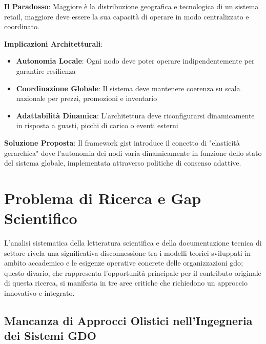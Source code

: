 \begin{tcolorbox}[
    colback=blue!5!white,
    colframe=blue!75!black,
    title={\textbf{Innovation Box 1.1:} Il Paradosso della Complessità Sistemica nella \gls{gdo}},
    fonttitle=\bfseries,
    boxrule=1.5pt,
    arc=2mm,
    breakable
]
\textbf{Il Paradosso}: Maggiore è la distribuzione geografica e tecnologica di un sistema retail, maggiore deve essere la sua capacità di operare in modo centralizzato e coordinato.

\vspace{0.3cm}
\textbf{Implicazioni Architetturali}:
\begin{itemize}
    \item \textbf{Autonomia Locale}: Ogni nodo deve poter operare indipendentemente per garantire resilienza
    \item \textbf{Coordinazione Globale}: Il sistema deve mantenere coerenza su scala nazionale per prezzi, promozioni e inventario
    \item \textbf{Adattabilità Dinamica}: L'architettura deve riconfigurarsi dinamicamente in risposta a guasti, picchi di carico o eventi esterni
\end{itemize}

\vspace{0.3cm}
\textbf{Soluzione Proposta}: Il framework \gls{gist} introduce il concetto di "elasticità gerarchica" dove l'autonomia dei nodi varia dinamicamente in funzione dello stato del sistema globale, implementata attraverso politiche di consenso adattive.
\end{tcolorbox}

\section{Problema di Ricerca e Gap Scientifico}
\label{sec:problema_ricerca}

L'analisi sistematica della letteratura scientifica e della documentazione tecnica di settore rivela una significativa disconnessione tra i modelli teorici sviluppati in ambito accademico e le esigenze operative concrete delle organizzazioni \gls{gdo}; questo divario, che rappresenta l'opportunità principale per il contributo originale di questa ricerca, si manifesta in tre aree critiche che richiedono un approccio innovativo e integrato.

\subsection{Mancanza di Approcci Olistici nell'Ingegneria dei Sistemi GDO}


